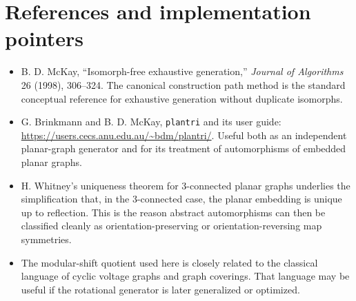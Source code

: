 \documentclass[11pt]{article}
\begin{document}
\section*{References and implementation pointers}

\begin{itemize}
  \item B. D. McKay, ``Isomorph-free exhaustive generation,'' \emph{Journal of Algorithms} 26 (1998), 306--324. The canonical construction path method is the standard conceptual reference for exhaustive generation without duplicate isomorphs.
  \item G. Brinkmann and B. D. McKay, \texttt{plantri} and its user guide: \url{https://users.cecs.anu.edu.au/~bdm/plantri/}. Useful both as an independent planar-graph generator and for its treatment of automorphisms of embedded planar graphs.
  \item H. Whitney's uniqueness theorem for 3-connected planar graphs underlies the simplification that, in the 3-connected case, the planar embedding is unique up to reflection. This is the reason abstract automorphisms can then be classified cleanly as orientation-preserving or orientation-reversing map symmetries.
  \item The modular-shift quotient used here is closely related to the classical language of cyclic voltage graphs and graph coverings. That language may be useful if the rotational generator is later generalized or optimized.
\end{itemize}
\end{document}
